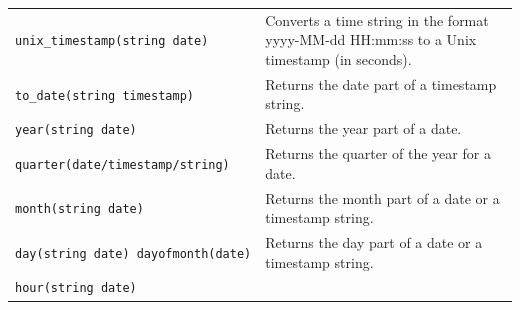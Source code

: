 \documentclass[
]{article}
\begin{document}
\begin{longtable}[]{@{}ll@{}}
\begin{minipage}[t]{0.39\columnwidth}
\texttt{unix\_timestamp(string\ date)}\strut
\end{minipage} & \begin{minipage}[t]{0.55\columnwidth}\raggedright
Converts a time string in the format yyyy-MM-dd HH:mm:ss to a Unix
timestamp (in seconds).\strut
\end{minipage}\tabularnewline
\begin{minipage}[t]{0.39\columnwidth}\raggedright
\texttt{to\_date(string\ timestamp)}\strut
\end{minipage} & \begin{minipage}[t]{0.55\columnwidth}\raggedright
Returns the date part of a timestamp string.\strut
\end{minipage}\tabularnewline
\begin{minipage}[t]{0.39\columnwidth}\raggedright
\texttt{year(string\ date)}\strut
\end{minipage} & \begin{minipage}[t]{0.55\columnwidth}\raggedright
Returns the year part of a date.\strut
\end{minipage}\tabularnewline
\begin{minipage}[t]{0.39\columnwidth}\raggedright
\texttt{quarter(date/timestamp/string)}\strut
\end{minipage} & \begin{minipage}[t]{0.55\columnwidth}\raggedright
Returns the quarter of the year for a date.\strut
\end{minipage}\tabularnewline
\begin{minipage}[t]{0.39\columnwidth}\raggedright
\texttt{month(string\ date)}\strut
\end{minipage} & \begin{minipage}[t]{0.55\columnwidth}\raggedright
Returns the month part of a date or a timestamp string.\strut
\end{minipage}\tabularnewline
\begin{minipage}[t]{0.39\columnwidth}\raggedright
\texttt{day(string\ date)\ dayofmonth(date)}\strut
\end{minipage} & \begin{minipage}[t]{0.55\columnwidth}\raggedright
Returns the day part of a date or a timestamp string.\strut
\end{minipage}\tabularnewline
\begin{minipage}[t]{0.39\columnwidth}\raggedright
\texttt{hour(string\ date)}\strut
\end{minipage} & \begin{minipage}[t]{0.55\columnwidth}\raggedright

\end{minipage}
\end{longtable}
\end{document}
